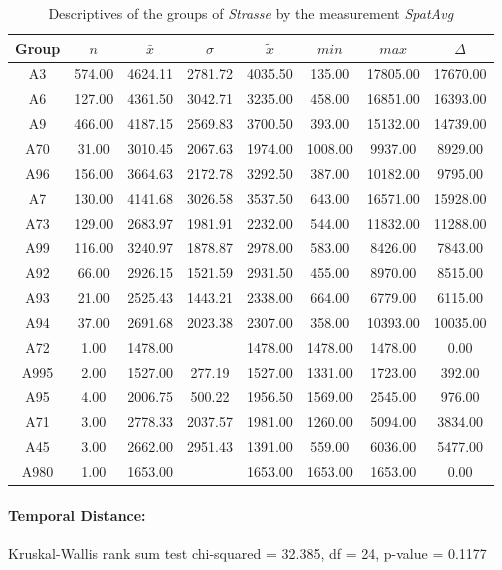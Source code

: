 \begin{table}[ht]
	\tiny
	\centering
	\begin{tabular}{c|c|c|c|c|c|c|c}
	  	\toprule
	 	Group & $n$ & $\bar{x}$ & $\sigma$ & $\tilde{x}$ & $min$ & $max$ & $\Delta$ \\  
	  	\midrule
		A3 & 574.00 & 4624.11 & 2781.72 & 4035.50 & 135.00 & 17805.00 & 17670.00 \\ 
	  	A6 & 127.00 & 4361.50 & 3042.71 & 3235.00 & 458.00 & 16851.00 & 16393.00 \\ 
	  	A9 & 466.00 & 4187.15 & 2569.83 & 3700.50 & 393.00 & 15132.00 & 14739.00 \\ 
	  	A70 & 31.00 & 3010.45 & 2067.63 & 1974.00 & 1008.00 & 9937.00 & 8929.00 \\ 
	  	A96 & 156.00 & 3664.63 & 2172.78 & 3292.50 & 387.00 & 10182.00 & 9795.00 \\ 
	  	A7 & 130.00 & 4141.68 & 3026.58 & 3537.50 & 643.00 & 16571.00 & 15928.00 \\ 
	  	A73 & 129.00 & 2683.97 & 1981.91 & 2232.00 & 544.00 & 11832.00 & 11288.00 \\ 
	  	A99 & 116.00 & 3240.97 & 1878.87 & 2978.00 & 583.00 & 8426.00 & 7843.00 \\ 
	  	A92 & 66.00 & 2926.15 & 1521.59 & 2931.50 & 455.00 & 8970.00 & 8515.00 \\ 
	  	A93 & 21.00 & 2525.43 & 1443.21 & 2338.00 & 664.00 & 6779.00 & 6115.00 \\ 
	  	A94 & 37.00 & 2691.68 & 2023.38 & 2307.00 & 358.00 & 10393.00 & 10035.00 \\ 
	  	A72 & 1.00 & 1478.00 &  & 1478.00 & 1478.00 & 1478.00 & 0.00  \\ 
	  	A995 & 2.00 & 1527.00 & 277.19 & 1527.00 & 1331.00 & 1723.00 & 392.00 \\ 
	  	A95 & 4.00 & 2006.75 & 500.22 & 1956.50 & 1569.00 & 2545.00 & 976.00 \\ 
	  	A71 & 3.00 & 2778.33 & 2037.57 & 1981.00 & 1260.00 & 5094.00 & 3834.00 \\ 
	  	A45 & 3.00 & 2662.00 & 2951.43 & 1391.00 & 559.00 & 6036.00 & 5477.00 \\ 
	  	A980 & 1.00 & 1653.00 &  & 1653.00 & 1653.00 & 1653.00 & 0.00  \\ 
	   	\bottomrule
	\end{tabular}
	\caption{Descriptives of the groups of \textit{Strasse} by the measurement \textit{SpatAvg}}
\end{table}

\paragraph{Temporal Distance:}
Kruskal-Wallis rank sum test chi-squared = 32.385, df = 24, p-value = 0.1177

